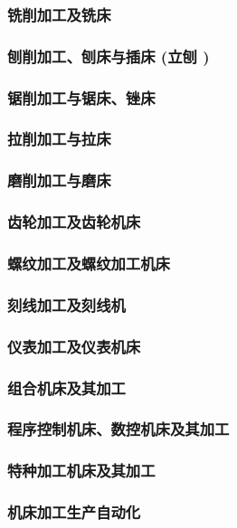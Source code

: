 \documentclass[UTF8]{../../ApplicationUniverse}
\begin{document}
\subsubsection{铣削加工及铣床}
\subsubsection{刨削加工、刨床与插床 (立刨 )}
\subsubsection{锯削加工与锯床、锉床}
\subsubsection{拉削加工与拉床}
\subsubsection{磨削加工与磨床}
\subsubsection{齿轮加工及齿轮机床}
\subsubsection{螺纹加工及螺纹加工机床}
\subsubsection{刻线加工及刻线机}
\subsubsection{仪表加工及仪表机床}
\subsubsection{组合机床及其加工}
\subsubsection{程序控制机床、数控机床及其加工}
\subsubsection{特种加工机床及其加工}
\subsubsection{机床加工生产自动化}
\end{document}
